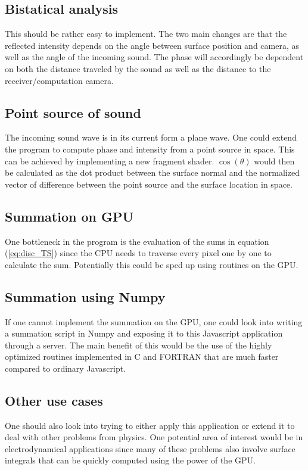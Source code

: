 \documentclass[a4paper, 11pt]{article}
\begin{document}
        \subsection{Bistatical analysis}
        This should be rather easy to implement. The two main changes are that the reflected intensity depends on the angle between surface position and camera, as well as the angle of the incoming sound. The phase will accordingly be dependent on both the distance traveled by the sound as well as the distance to the receiver/computation camera.

        \subsection{Point source of sound}
        The incoming sound wave is in its current form a plane wave. One could extend the program to compute phase and intensity from a point source in space. This can be achieved by implementing a new fragment shader. $\cos(\theta)$ would then be calculated as the dot product between the surface normal and the normalized vector of difference between the point source and the surface location in space. 

        \subsection{Summation on GPU}
        One bottleneck in the program is the evaluation of the sums in equation (\ref{eq:disc_TS}) since the CPU needs to traverse every pixel one by one to calculate the sum. Potentially this could be sped up using routines on the GPU. 

        \subsection{Summation using Numpy}
        If one cannot implement the summation on the GPU, one could look into writing a summation script in Numpy and exposing it to this Javascript application through a server. The main benefit of this would be the use of the highly optimized routines implemented in C and FORTRAN that are much faster compared to ordinary Javascript. 
        
        \subsection{Other use cases}
        One should also look into trying to either apply this application or extend it to deal with other problems from physics. One potential area of interest would be in electrodynamical applications since many of these problems also involve surface integrals that can be quickly computed using the power of the GPU. 
\end{document}
